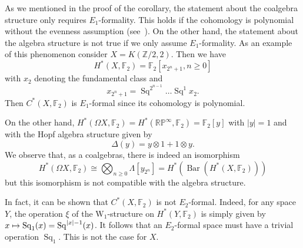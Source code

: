 \documentclass[AHL,Unicode,longabstracts,published]{cedram}
\DeclareMathOperator{\rBar}{Bar}
\DeclareMathOperator{\rSq}{Sq}
\newcommand{\W}{\mathrm{W}}
\newcommand{\ZZ}{\mathbb{Z}}
\newcommand{\FF}{\mathbb{F}}
\newcommand{\bbRP}{\mathbb{RP}}
\let\oldmapsto\mapsto
\renewcommand*{\mapsto}{\mathchoice{\longmapsto}{\oldmapsto}{\oldmapsto}{\oldmapsto}}
\newcommand{\FF}{\mathbb{F}}
\begin{document}
\begin{rema}
As we mentioned in the proof of the corollary, the statement about the coalgebra structure only requires $E_1$-formality. This holds if the cohomology is polynomial without the evenness assumption (see~\cite{halperinrite}). On the other hand, the statement about the algebra structure is not true if we only assume $E_1$-formality. As an example of this phenomenon consider $X=K(\ZZ/2,2)$. Then we have
\[
H^*(X,\FF_2)=\FF_2[x_{2^n+1},n\geq 0]
\]
with $x_2$ denoting the fundamental class and
\[
x_{2^n+1}=\rSq^{2^{n-1}}\ldots\rSq^1 x_2.
\]
Then $C^*(X,\FF_2)$ is $E_1$-formal since its cohomology is polynomial.

On the other hand, $H^*(\Omega X,\FF_2)=H^*(\bbRP^\infty,\FF_2)=\FF_2[y]$ with $|y|=1$ and with the Hopf algebra structure given by
\[
\Delta(y)=y\otimes 1+1\otimes y.
\]
We observe that, as a coalgebras, there is indeed an isomorphism
\[
H^*(\Omega X,\FF_2)\cong\bigotimes_{n\geq 0}\Lambda[y_{2^n}]=H^*(\rBar(H^*(X,\FF_2)))
\]
but this isomorphism is not compatible with the algebra structure.

In fact, it can be shown that $C^*(X,\FF_2)$ is not $E_2$-formal. Indeed, for any space $Y$, the operation $\xi$ of the $\W_1$-structure on $H^*(Y,\FF_2)$ is simply given by $x\mapsto \rSq_1(x)=\rSq^{|x|-1}(x)$. It follows that an $E_2$-formal space must have a trivial operation $\rSq_1$. This is not the case for $X$.
\end{rema}


\let\OLDthebibliography\thebibliography
\renewcommand\thebibliography[1]{
\OLDthebibliography{#1}
\setlength{\parskip}{0pt}
\setlength{\itemsep}{7pt plus 0.3ex}}


\end{document}
